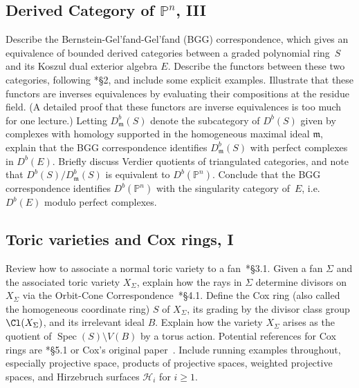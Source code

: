 \documentclass[11pt]{amsart}
\numberwithin{equation}{section}
\theoremstyle{definition}
\theoremstyle{remark}
\newcommand{\m}{\mathfrak m}
\newcommand{\PP}{\mathbb P}
\newcommand{\Spec}{\operatorname{Spec}}
\begin{document}
\subsection{Derived Category of $\PP^n$, III}
\label{sec:pn3}
Describe the Bernstein-Gel'fand-Gel'fand (BGG) correspondence, which gives an equivalence of bounded derived categories between a graded polynomial ring~$S$ and its Koszul dual exterior algebra $E$. Describe the functors between these two categories, following \cite{EFS03}*{\S 2}, and include some explicit examples. Illustrate that these functors are inverses equivalences by evaluating their compositions at the residue field. (A detailed proof that these functors are inverse equivalences is too much for one lecture.) Letting $D^b_\m(S)$ denote the subcategory of $D^b(S)$ given by complexes with homology supported in the homogeneous maximal ideal $\m$, explain that the BGG correspondence identifies $D^b_\m(S)$  with perfect complexes in $D^b(E)$. Briefly discuss Verdier quotients of triangulated categories, and note that $D^b(S) / D^b_\m(S)$ is equivalent to $D^b(\PP^n)$. Conclude that the BGG correspondence identifies $D^b(\PP^n)$ with the singularity category of~$E$, i.e. $D^b(E)$ modulo perfect complexes. 



\subsection{Toric varieties and Cox rings, I}
Review how to associate a normal toric variety to a fan~\cite{CLS2011}*{\S 3.1}. Given a fan $\Sigma$ and the associated toric variety $X_\Sigma$, explain how the rays in $\Sigma$ determine divisors on $X_\Sigma$ via the Orbit-Cone Correspondence~\cite{CLS2011}*{\S 4.1}. Define the Cox ring (also called the homogeneous coordinate ring) $S$ of $X_\Sigma$, its grading by the divisor class group $\Cl(X_\Sigma)$, and its irrelevant ideal $B$. Explain how the variety $X_\Sigma$ arises as the quotient of $\Spec(S) \setminus V(B)$ by a torus action. Potential references for Cox rings are \cite{CLS2011}*{\S 5.1} or Cox's original paper~\cite{Cox95}. Include running examples throughout, especially projective space, products of projective spaces, weighted projective spaces, and Hirzebruch surfaces $\mathcal{H}_i$ for $i \ge 1$. 


\end{document}
